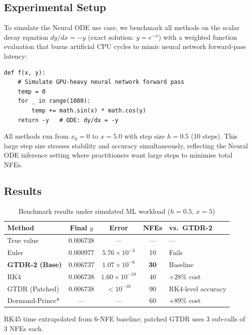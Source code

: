 \documentclass[conference]{IEEEtran}
\begin{document}
\subsection{Experimental Setup}

To simulate the Neural ODE use case, we benchmark all methods on the
scalar decay equation $dy/dx = -y$ (exact solution: $y = e^{-x}$) with
a weighted function evaluation that burns artificial CPU cycles to
mimic neural network forward-pass latency:

\begin{lstlisting}[caption={Simulated neural-network-weighted evaluation}]
def f(x, y):
    # Simulate GPU-heavy neural network forward pass
    temp = 0
    for _ in range(1000):
        temp += math.sin(x) * math.cos(y)
    return -y   # ODE: dy/dx = -y
\end{lstlisting}

All methods run from $x_0 = 0$ to $x = 5.0$ with step size $h = 0.5$
(10 steps). This large step size stresses stability and accuracy
simultaneously, reflecting the Neural ODE inference setting where
practitioners want large steps to minimise total NFEs.

\subsection{Results}

\begin{table}[ht]
\centering
\caption{Benchmark results under simulated ML workload ($h=0.5$, $x=5$)}
\label{tab:benchmark}
\begin{tabular}{lcccl}
\toprule
\textbf{Method} & \textbf{Final $y$} & \textbf{Error} & \textbf{NFEs} & \textbf{vs.~GTDR-2} \\
\midrule
True value              & 0.006738 & ---                 & ---  & --- \\
Euler                   & 0.000977 & $5.76\times10^{-3}$ & 10   & Fails \\
\textbf{GTDR-2 (Base)}  & 0.006737 & $1.07\times10^{-6}$ & \textbf{30}   & Baseline \\
RK4                     & 0.006738 & $1.60\times10^{-10}$& 40   & $+28\%$ cost \\
GTDR (Patched)          & 0.006738 & $<10^{-10}$         & 90   & RK4-level accuracy \\
Dormand-Prince*         & ---      & ---                 & 60   & $+89\%$ cost \\
\bottomrule
\end{tabular}
\smallskip
\begin{minipage}{\linewidth}
\footnotesize *RK45 time extrapolated from 6-NFE baseline;
patched GTDR uses 3 sub-calls of 3 NFEs each.
\end{minipage}
\end{table}
\end{document}
